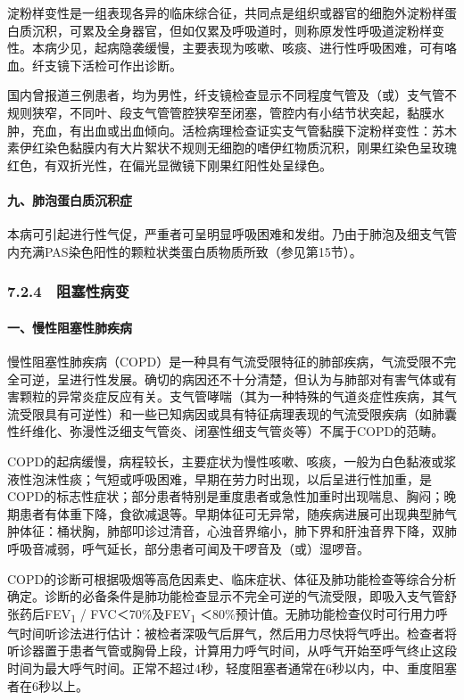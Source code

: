 淀粉样变性是一组表现各异的临床综合征，共同点是组织或器官的细胞外淀粉样蛋白质沉积，可累及全身器官，但如仅累及呼吸道时，则称原发性呼吸道淀粉样变性。本病少见，起病隐袭缓慢，主要表现为咳嗽、咳痰、进行性呼吸困难，可有咯血。纤支镜下活检可作出诊断。

国内曾报道三例患者，均为男性，纤支镜检查显示不同程度气管及（或）支气管不规则狭窄，不同叶、段支气管管腔狭窄至闭塞，管腔内有小结节状突起，黏膜水肿，充血，有出血或出血倾向。活检病理检查证实支气管黏膜下淀粉样变性：苏木素伊红染色黏膜内有大片絮状不规则无细胞的嗜伊红物质沉积，刚果红染色呈玫瑰红色，有双折光性，在偏光显微镜下刚果红阳性处呈绿色。

\paragraph{九、肺泡蛋白质沉积症}

本病可引起进行性气促，严重者可呈明显呼吸困难和发绀。乃由于肺泡及细支气管内充满PAS染色阳性的颗粒状类蛋白质物质所致（参见第15节）。

\subsubsection{7.2.4　阻塞性病变}

\paragraph{一、慢性阻塞性肺疾病}

慢性阻塞性肺疾病（COPD）是一种具有气流受限特征的肺部疾病，气流受限不完全可逆，呈进行性发展。确切的病因还不十分清楚，但认为与肺部对有害气体或有害颗粒的异常炎症反应有关。支气管哮喘（其为一种特殊的气道炎症性疾病，其气流受限具有可逆性）和一些已知病因或具有特征病理表现的气流受限疾病（如肺囊性纤维化、弥漫性泛细支气管炎、闭塞性细支气管炎等）不属于COPD的范畴。

COPD的起病缓慢，病程较长，主要症状为慢性咳嗽、咳痰，一般为白色黏液或浆液性泡沫性痰；气短或呼吸困难，早期在劳力时出现，以后呈进行性加重，是COPD的标志性症状；部分患者特别是重度患者或急性加重时出现喘息、胸闷；晚期患者有体重下降，食欲减退等。早期体征可无异常，随疾病进展可出现典型肺气肿体征：桶状胸，肺部叩诊过清音，心浊音界缩小，肺下界和肝浊音界下降，双肺呼吸音减弱，呼气延长，部分患者可闻及干啰音及（或）湿啰音。

COPD的诊断可根据吸烟等高危因素史、临床症状、体征及肺功能检查等综合分析确定。诊断的必备条件是肺功能检查显示不完全可逆的气流受限，即吸入支气管舒张药后FEV\textsubscript{1}
/ FVC＜70\%及FEV\textsubscript{1}
＜80\%预计值。无肺功能检查仪时可行用力呼气时间听诊法进行估计：被检者深吸气后屏气，然后用力尽快将气呼出。检查者将听诊器置于患者气管或胸骨上段，计算用力呼气时间，从呼气开始至呼气终止这段时间为最大呼气时间。正常不超过4秒，轻度阻塞者通常在6秒以内，中、重度阻塞者在6秒以上。

